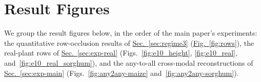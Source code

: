 \documentclass[10pt,twocolumn,letterpaper]{article}
\newcommand{\figref}[1]{\hyperref[#1]{Fig.~\ref*{#1}}}
\newcommand{\secref}[1]{\hyperref[#1]{Sec.~\ref*{#1}}}
\begin{document}
\section{Result Figures}
\label{app:figures}

We group the result figures below, in the order of the main paper's experiments: the quantitative row-occlusion results of \secref{sec:regime3} (\figref{fig:rows}), the real-plant rows of \secref{sec:exp-real} (\textcolor{cvprblue}{Figs.}~\ref{fig:e10_height}, \ref{fig:e10_real}, and~\ref{fig:e10_real_sorghum}), and the any-to-all cross-modal reconstructions of \secref{sec:exp-main} (\textcolor{cvprblue}{Figs.}~\ref{fig:any2any-maize} and~\ref{fig:any2any-sorghum}).



\end{document}
